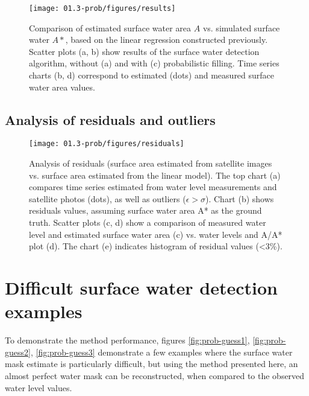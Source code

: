 \begin{figure}[H]
	\centering
	\texttt{[image: 01.3-prob/figures/results]}
	\caption{Comparison of estimated surface water area $A$ vs. simulated surface water $A*$, based on the linear regression constructed previously. Scatter plots (a, b) show results of the surface water detection algorithm, without (a) and with (c) probabilistic filling. Time series charts (b, d) correspond to estimated (dots) and measured surface water area values.}
	\label{fig:prob-results}
\end{figure}

\subsection{Analysis of residuals and outliers}

\begin{figure}[H]
	\centering
	\texttt{[image: 01.3-prob/figures/residuals]}
	\caption{Analysis of residuals (surface area estimated from satellite images vs. surface area estimated from the linear model). The top chart (a) compares time series estimated from water level measurements and satellite photos (dots), as well as outliers ($\epsilon > \sigma$). Chart (b) shows residuals values, assuming surface water area A* as the ground truth. Scatter plots (c, d) show a comparison of measured water level and estimated surface water area (c) vs. water levels and A/A* plot (d). The chart (e) indicates histogram of residual values (<3\%).}
	\label{fig:prob-results}
\end{figure}


\section{Difficult surface water detection examples}

To demonstrate the method performance, figures \ref{fig:prob-guess1}, \ref{fig:prob-guess2}, \ref{fig:prob-guess3} demonstrate a few examples where the surface water mask estimate is particularly difficult, but using the method presented here, an almost perfect water mask can be reconstructed, when compared to the observed water level values. 

